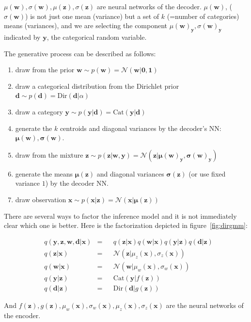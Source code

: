 \documentclass[11pt, a4paper]{report}
\theoremstyle{plain}
\theoremstyle{definition}
\theoremstyle{remark}
\newcommand{\x}{\mathbf{x}}
\newcommand{\z}{\mathbf{z}}
\newcommand{\y}{\mathbf{y}}
\newcommand{\w}{\mathbf{w}}
\newcommand{\dd}{\mathbf{d}}
\newcommand{\NN}{\mathcal{N}}
\newcommand{\bv}[1]{\boldsymbol{#1}}
\begin{document}
$\mu(\w), \sigma(\w), \mu(\z), \sigma(\z)$ are neural networks of the decoder.
$\mu(\w)$, ($\sigma(\w)$) is not just one mean (variance) but a set of $k$ (=number of categories)
means (variances), 
and we are selecting the component $\mu(\w)_{\y}, \sigma(\w)_{\y}$
indicated by $\y$, the categorical random
variable.

The generative process can be described as follows:
\begin{enumerate}
\item{} draw from the prior $\w \sim p(\w) = \NN(\w|\bv{0},\bv{1})$
\item{} draw a categorical distribution from the Dirichlet prior
$\dd \sim p(\dd) = \text{Dir}(\dd | \alpha)$
\item{} draw a category $\y \sim p(\y | \dd) = \text{Cat}(\y | \dd)$
\item{} generate the $k$ centroids and diagonal variances by the decoder's NN:
$\bv{\mu}(\w), \bv{\sigma}(\w)$.
\item draw from the mixture $\z \sim p(\z | \w,\y) = \NN(\z|\bv{\mu}(\w)_{\y},
\bv{\sigma}(\w)_{\y})$
\item{} generate the means $\bv{\mu}(\z)$ and diagonal variances
$\bv{\sigma}(\z)$ (or use fixed variance $1$) by the decoder NN.
\item{} draw observation $\x \sim p(\x | \z) = \NN(\x|\bv{\mu}(\z))$
\end{enumerate}

There are several ways to factor the inference model and it is not immediately
clear which one is better. Here is the factorization depicted in
figure~\ref{fig:dirgmm}:

\begin{equation}
\begin{aligned}
&q(\y, \z, \w, \dd | \x) &=& 
&q(\z | \x) q(\w | \x) q(\y | \z) q(\dd | \z) \\
&q(\z | \x) &=& &\NN(\z | \mu_z(\x), \sigma_z(\x)) \\
&q(\w | \x) &=& &\NN(\w | \mu_w(\x), \sigma_w(\x)) \\
&q(\y | \z) &=& &\text{Cat}(\y | f(\z)) \\
&q(\dd | \z) &=& &\text{Dir}(\dd | g(\z))
\label{eq:gmmqfact}
\end{aligned}
\end{equation}

And $f(\z),g(\z), \mu_w(\x), \sigma_w(\x), \mu_z(\x), \sigma_z(\x)$ are
the neural networks of the encoder.
\end{document}
